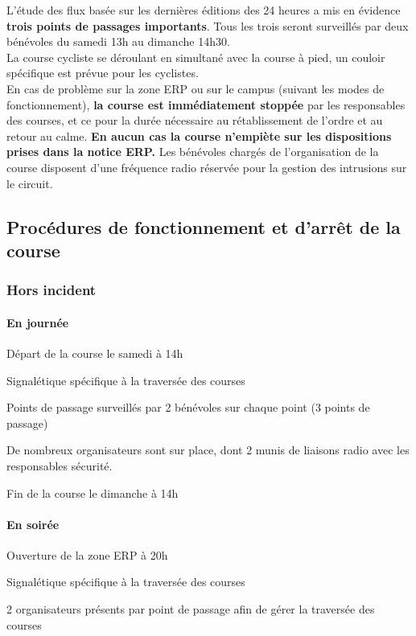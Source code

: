 \documentclass[hidelinks, paper=a4, fontsize=13pt]{report}
\begin{document}
L’étude des flux basée sur les dernières éditions des 24 heures a mis en évidence \textbf{trois points de passages importants}. Tous les trois seront surveillés par deux bénévoles du samedi 13h au dimanche 14h30.\\

La course cycliste se déroulant en simultané avec la course à pied, un couloir spécifique est prévue pour les cyclistes.\\

En cas de problème sur la zone ERP ou sur le campus (suivant les modes de fonctionnement), \textbf{la course est immédiatement stoppée} par les responsables des courses, et ce pour la durée nécessaire au rétablissement de l’ordre et au retour au calme. \textbf{En aucun cas la course n’empiète sur les dispositions prises dans la notice ERP.} Les bénévoles chargés de l’organisation de la course disposent d’une fréquence radio réservée pour la gestion des intrusions sur le circuit.

\subsection{Procédures de fonctionnement et d’arrêt de la course}

\subsubsection{Hors incident}

\paragraph{En journée}
\begin{list}{•}{}
\item Départ de la course le samedi à 14h
\item Signalétique spécifique à la traversée des courses
\item Points de passage surveillés par 2 bénévoles sur chaque point (3 points de passage)
\item De nombreux organisateurs sont sur place, dont 2 munis de liaisons radio avec les responsables sécurité.
\item Fin de la course le dimanche à 14h
\end{list}

\paragraph{En soirée}
\begin{list}{•}{}
\item Ouverture de la zone ERP à 20h
\item Signalétique spécifique à la traversée des courses
\item 2 organisateurs présents par point de passage afin de gérer la traversée des courses
\end{list}
\end{document}

